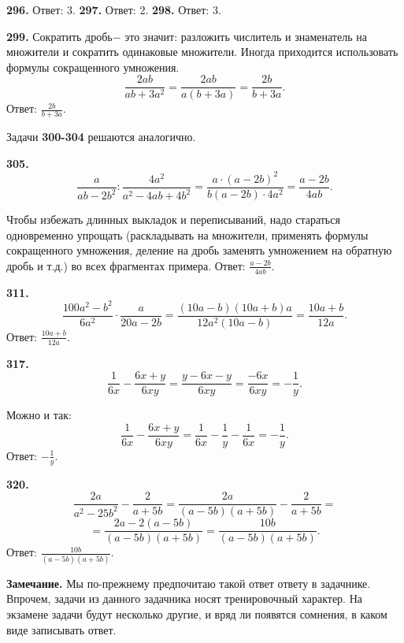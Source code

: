 \textbf{296.} Ответ: 3. \textbf{297.} Ответ: 2. \textbf{298.} Ответ: 3.

\textbf{299.} Сократить дробь$-$ это значит: разложить числитель и знаменатель на множители и сократить одинаковые множители. Иногда приходится использовать формулы сокращенного умножения.
$$\frac{2ab}{ab+3a^2}=\frac{2ab}{a\left(b+3a\right)}=\frac{2b}{b+3a}.$$ \newline \null \hspace*{\fill} Ответ: $\frac{2b}{b+3a}$. 

Задачи \textbf{300-304} решаются аналогично. 

\textbf{305.} $$\frac{a}{ab-2b^2}:\frac{4a^2}{a^2-4ab+4b^2}=\frac{a\cdot\left(a-2b\right)^2}{b\left(a-2b\right)\cdot4a^2}=\frac{a-2b}{4ab}.$$

Чтобы избежать длинных выкладок и переписываний, надо стараться одновременно упрощать (раскладывать на множители, применять формулы сокращенного умножения, деление на дробь заменять умножением на обратную дробь и т.д.) во всех фрагментах примера. \newline \null \hspace*{\fill} Ответ: $\frac{a-2b}{4ab}$. 

\textbf{311.}  $$\frac{100a^2-b^2}{6a^2}\cdot\frac{a}{20a-2b}=\frac{\left(10a-b\right)\left(10a+b\right)a}{12a^2\left(10a-b\right)}=\frac{10a+b}{12a}.$$  \null \hspace*{\fill} Ответ: $\frac{10a+b}{12a}$.

\textbf{317.} $$\frac{1}{6x}-\frac{6x+y}{6xy}=\frac{y-6x-y}{6xy}=\frac{-6x}{6xy}=-\frac{1}{y}.$$ 

\newpage Можно и так: $$\frac{1}{6x}-\frac{6x+y}{6xy}=\frac{1}{6x}-\frac{1}{y}-\frac{1}{6x}=-\frac{1}{y}.$$  \null \hspace*{\fill} Ответ: $-\frac{1}{y}$.

\textbf{320.} $$\frac{2a}{a^2-25b^2}-\frac{2}{a+5b}=\frac{2a}{\left(a-5b\right)\left(a+5b\right)}-\frac{2}{a+5b}=$$ $$=\frac{2a-2\left(a-5b\right)}{\left(a-5b\right)\left(a+5b\right)}=\frac{10b}{\left(a-5b\right)\left(a+5b\right)}.$$ \newline \null \hspace*{\fill} Ответ: $\frac{10b}{\left(a-5b\right)\left(a+5b\right)}$.

\textbf{Замечание.} Мы по-прежнему предпочитаю такой ответ ответу в задачнике. Впрочем, задачи из данного задачника носят тренировочный характер. На экзамене задачи будут несколько другие, и вряд ли появятся сомнения, в каком виде записывать ответ. 

